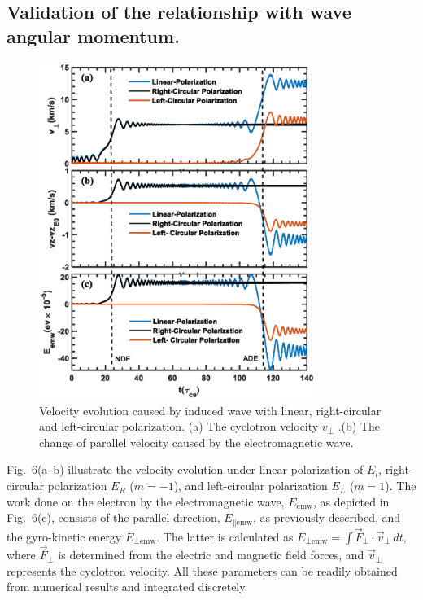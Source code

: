 \documentclass{cpbtex}
\begin{document}
\begin{CJK*}{GBK}{song}
\subsection{Validation of the relationship with wave angular momentum. }
\begin{figure}[htbp]
\centering
\includegraphics[width=0.8\textwidth]{Figure6.eps}%
\caption{Velocity evolution caused by induced wave with linear, right-circular and left-circular polarization. (a) The cyclotron velocity $v_\perp$ .(b) The change of parallel velocity caused by the electromagnetic wave.}
    \label{fig:6}
\end{figure}

Fig.~6(a--b) illustrate the velocity evolution under linear polarization of \( E_l \), right-circular polarization \( E_R \) (\( m = -1 \)), and left-circular polarization \( E_L \) (\( m = 1 \)). The work done on the electron by the electromagnetic wave, \( E_{\text{emw}} \), as depicted in Fig.~6(c), consists of the parallel direction, \( E_{\parallel\text{emw}} \), as previously described, and the gyro-kinetic energy \( E_{\perp\text{emw}} \). The latter is calculated as
\(
E_{\perp\text{emw}} = \int \vec{F}_{\perp} \cdot \vec{v}_{\perp} \, dt,
\)
where \( \vec{F}_{\perp} \) is determined from the electric and magnetic field forces, and \( \vec{v}_{\perp} \) represents the cyclotron velocity. All these parameters can be readily obtained from numerical results and integrated discretely.


\end{CJK*}
\end{document}
